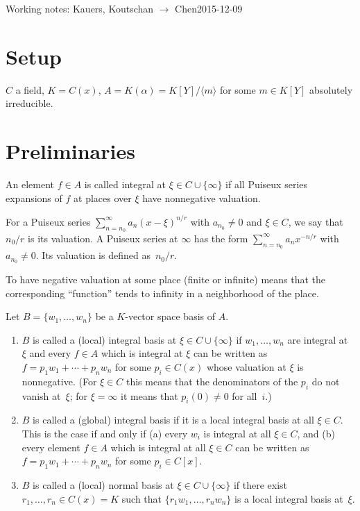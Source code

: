 \documentclass[a4paper,draft]{article}
\def\<#1>{\langle#1\rangle}
\begin{document}
Working notes: Kauers, Koutschan $\to$ Chen\hfill 2015-12-09

\section{Setup}

$C$ a field, $K=C(x)$, $A=K(\alpha)=K[Y]/\<m>$ for some $m\in K[Y]$ absolutely irreducible.

\section{Preliminaries}

An element $f\in A$ is called integral at $\xi\in C\cup\{\infty\}$ if all
Puiseux series expansions of $f$ at places over $\xi$ have nonnegative
valuation.

For a Puiseux series $\sum_{n=n_0}^\infty a_n(x-\xi)^{n/r}$ with $a_{n_0}\neq0$
and $\xi\in C$, we say that $n_0/r$ is its valuation. A Puiseux series at
$\infty$ has the form $\sum_{n=n_0}^\infty a_n x^{-n/r}$ with $a_{n_0}\neq0$.
Its valuation is defined as~$n_0/r$.

To have negative valuation at some place (finite or infinite) means that the
corresponding ``function'' tends to infinity in a neighborhood of the place.

Let $B=\{w_1,\dots,w_n\}$ be a $K$-vector space basis of $A$.
\begin{enumerate}
\item $B$ is called a (local) integral basis
at $\xi\in C\cup\{\infty\}$ if $w_1,\dots,w_n$ are integral at $\xi$ and every
$f\in A$ which is integral at $\xi$ can be written as $f=p_1w_1+\cdots+p_nw_n$
for some $p_i\in C(x)$ whose valuation at $\xi$ is nonnegative. (For $\xi\in C$
this means that the denominators of the $p_i$ do not vanish at~$\xi$; for $\xi=\infty$
it means that $p_i(0)\neq0$ for all~$i$.)
\item $B$ is called a (global) integral basis
if it is a local integral basis at all $\xi\in C$. This is the case if and only if
(a) every $w_i$ is integral at all $\xi\in C$, and
(b) every element $f\in A$ which is integral at all $\xi\in C$ can be written
as $f=p_1w_1+\cdots+p_nw_n$ for some $p_i\in C[x]$.
\item $B$ is called a (local) normal basis at $\xi\in C\cup\{\infty\}$ if there
  exist $r_1,\dots,r_n\in C(x)=K$ such that $\{r_1w_1,\dots,r_nw_n\}$ is a local
  integral basis at~$\xi$.
\end{enumerate}
\end{document}
